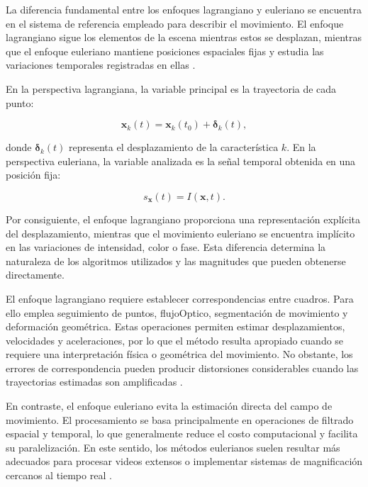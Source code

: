 La diferencia fundamental entre los enfoques lagrangiano y euleriano se encuentra en el sistema de referencia empleado para describir el movimiento. El enfoque lagrangiano sigue los elementos de la escena mientras estos se desplazan, mientras que el enfoque euleriano mantiene posiciones espaciales fijas y estudia las variaciones temporales registradas en ellas \cite{ahmed2023overview}.

En la perspectiva lagrangiana, la variable principal es la trayectoria de cada punto:

\begin{equation}
    \mathbf{x}_k(t)
    =
    \mathbf{x}_k(t_0)
    +
    \boldsymbol{\delta}_k(t),
    \label{eq:variable_lagrangiana_comparacion}
\end{equation}

donde $\boldsymbol{\delta}_k(t)$ representa el desplazamiento de la característica $k$. En la perspectiva euleriana, la variable analizada es la señal temporal obtenida en una posición fija:

\begin{equation}
    s_{\mathbf{x}}(t)=I(\mathbf{x},t).
    \label{eq:variable_euleriana_comparacion}
\end{equation}

Por consiguiente, el enfoque lagrangiano proporciona una representación explícita del desplazamiento, mientras que el movimiento euleriano se encuentra implícito en las variaciones de intensidad, color o fase. Esta diferencia determina la naturaleza de los algoritmos utilizados y las magnitudes que pueden obtenerse directamente.

El enfoque lagrangiano requiere establecer correspondencias entre cuadros. Para ello emplea seguimiento de puntos, \gls{flujoOptico}, segmentación de movimiento y deformación geométrica. Estas operaciones permiten estimar desplazamientos, velocidades y aceleraciones, por lo que el método resulta apropiado cuando se requiere una interpretación física o geométrica del movimiento. No obstante, los errores de correspondencia pueden producir distorsiones considerables cuando las trayectorias estimadas son amplificadas \cite{liu2005motion}.

En contraste, el enfoque euleriano evita la estimación directa del campo de movimiento. El procesamiento se basa principalmente en operaciones de filtrado espacial y temporal, lo que generalmente reduce el costo computacional y facilita su paralelización. En este sentido, los métodos eulerianos suelen resultar más adecuados para procesar videos extensos o implementar sistemas de magnificación cercanos al tiempo real \cite{wu2012eulerian,wadhwa2014riesz}.

